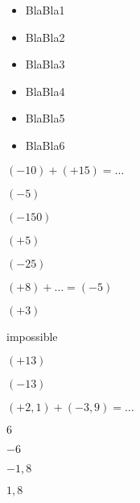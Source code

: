 \begin{acquis}
\begin{itemize}
\item BlaBla1
\item BlaBla2
\item BlaBla3
\item BlaBla4
\item BlaBla5
\item BlaBla6
\end{itemize}
\end{acquis}


\begin{QCM}
  \begin{GroupeQCM}
    \begin{exercice}
      $(-10) + (+15) = \ldots$
      \begin{ChoixQCM}{4}
      \item $(-5)$
      \item $(-150)$
      \item $(+5)$
      \item $(-25)$
      \end{ChoixQCM}
\begin{corrige}
   \end{corrige}
    \end{exercice}
    
    
    \begin{exercice}
      $(+8) + \ldots = (-5)$
      \begin{ChoixQCM}{4}
      \item $(+3)$
      \item impossible
      \item $(+13)$
      \item $(-13)$
      \end{ChoixQCM}
\begin{corrige}
   \end{corrige}
    \end{exercice}


    \begin{exercice}
      $(+2,1) + (-3,9) = \ldots$
      \begin{ChoixQCM}{4}
      \item $6$
      \item $-6$
      \item $-1,8$
      \item $1,8$
      \end{ChoixQCM}
\begin{corrige}
   \end{corrige}
    \end{exercice}



\end{GroupeQCM}
\end{QCM}

